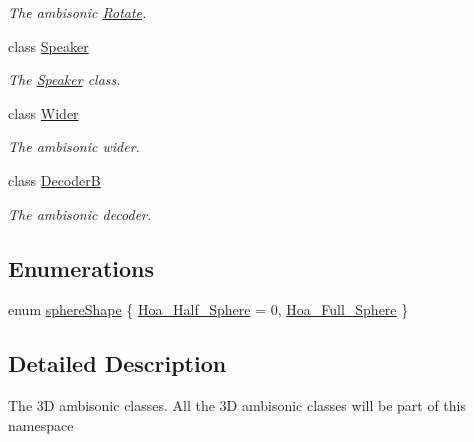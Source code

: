 \begin{DoxyCompactItemize}
\begin{DoxyCompactList}\small\item\em The ambisonic \hyperlink{class_hoa3_d_1_1_rotate}{Rotate}. \end{DoxyCompactList}\item 
class \hyperlink{class_hoa3_d_1_1_speaker}{Speaker}
\begin{DoxyCompactList}\small\item\em The \hyperlink{class_hoa3_d_1_1_speaker}{Speaker} class. \end{DoxyCompactList}\item 
class \hyperlink{class_hoa3_d_1_1_wider}{Wider}
\begin{DoxyCompactList}\small\item\em The ambisonic wider. \end{DoxyCompactList}\item 
class \hyperlink{class_hoa3_d_1_1_decoder_b}{Decoder\-B}
\begin{DoxyCompactList}\small\item\em The ambisonic decoder. \end{DoxyCompactList}\end{DoxyCompactItemize}
\subsection*{Enumerations}
\begin{DoxyCompactItemize}
\item 
enum \hyperlink{namespace_hoa3_d_a96e1558dd670aa7cddab38a58aa10c49}{sphere\-Shape} \{ \hyperlink{namespace_hoa3_d_a96e1558dd670aa7cddab38a58aa10c49a688ab39f396b4912d261dc7a89e7dba8}{Hoa\-\_\-\-Half\-\_\-\-Sphere} = 0, 
\hyperlink{namespace_hoa3_d_a96e1558dd670aa7cddab38a58aa10c49aeb2d6c7f779a838421f9999a46a2ca22}{Hoa\-\_\-\-Full\-\_\-\-Sphere}
 \}
\end{DoxyCompactItemize}


\subsection{Detailed Description}
The 3\-D ambisonic classes. All the 3\-D ambisonic classes will be part of this namespace 

